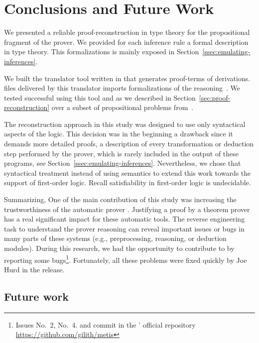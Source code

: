 \documentclass[../main.tex]{subfiles}
\begin{document}

\section{Conclusions and Future Work}
\label{sec:conclusions}

We presented a reliable proof-reconstruction in type theory
for the propositional fragment of the \Metis prover. We provided for
each \Metis inference rule a formal description in type theory.
This formalizations is mainly exposed in
Section~\ref{ssec:emulating-inferences}.

We built the \Athena translator tool written in \Haskell
that generates \Agda proof-terms of \Metis derivations.
\Agda files delivered by this translator imports
\Agda formalizations of the \Metis reasoning~\cite{AgdaProp,AgdaMetis}.
We tested successful using this tool and \Agda as we
described in Section~\ref{sec:proof-reconstruction} over a subset of
propositional problems from~\cite{Prieto-Cubides2017}.

The reconstruction approach in this study was designed to use
only syntactical aspects of the logic.
This decision was in the beginning a drawback
since it demands more detailed proofs, a
description of every transformation or deduction step performed by
the prover, which is rarely included in the output of these programs,
see Section~\ref{ssec:emulating-inferences}.
Nevertheless, we chose that syntactical treatment instead of using
semantics to extend this work towards the support of first-order logic.
Recall satisfiability in first-order logic is undecidable.

Summarizing,
One of the main contribution of this study was
increasing the trustworthiness of the automatic prover \Metis.
Justifying a proof by a theorem prover
has a real significant impact for these automatic tools.
The reverse engineering task to understand the prover reasoning
can reveal important issues or bugs
in many parts of these systems (e.g., preprocessing, reasoning, or
deduction modules). During this research, we had the opportunity
to contribute to \Metis by reporting some bugs\footnote{Issues No.~2,
No.~4. and commit  in the \Metis' official repository
\url{https://github.com/gilith/metis}}.
Fortunately, all these problems were fixed quickly by Joe Hurd in
the  release.

\subsection*{Future work}
\end{document}

